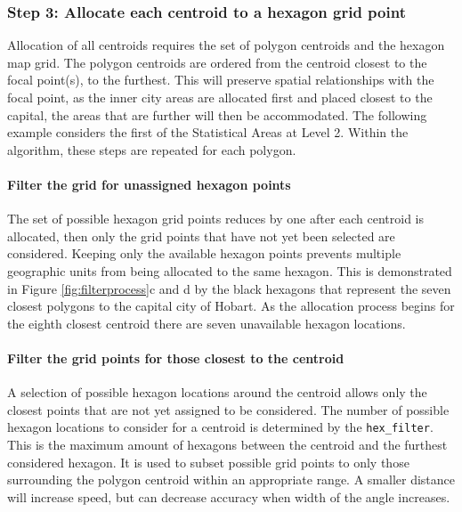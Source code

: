 \hypertarget{step-3-allocate-each-centroid-to-a-hexagon-grid-point}{%
\subsubsection{Step 3: Allocate each centroid to a hexagon grid
point}\label{step-3-allocate-each-centroid-to-a-hexagon-grid-point}}

Allocation of all centroids requires the set of polygon centroids and
the hexagon map grid. The polygon centroids are ordered from the
centroid closest to the focal point(s), to the furthest. This will
preserve spatial relationships with the focal point, as the inner city
areas are allocated first and placed closest to the capital, the areas
that are further will then be accommodated. The following example
considers the first of the Statistical Areas at Level 2. Within the
algorithm, these steps are repeated for each polygon.

\hypertarget{filter-the-grid-for-unassigned-hexagon-points}{%
\paragraph{Filter the grid for unassigned hexagon
points}\label{filter-the-grid-for-unassigned-hexagon-points}}

The set of possible hexagon grid points reduces by one after each
centroid is allocated, then only the grid points that have not yet been
selected are considered. Keeping only the available hexagon points
prevents multiple geographic units from being allocated to the same
hexagon. This is demonstrated in Figure \ref{fig:filterprocess}c and d
by the black hexagons that represent the seven closest polygons to the
capital city of Hobart. As the allocation process begins for the eighth
closest centroid there are seven unavailable hexagon locations.

\hypertarget{filter-the-grid-points-for-those-closest-to-the-centroid}{%
\paragraph{Filter the grid points for those closest to the
centroid}\label{filter-the-grid-points-for-those-closest-to-the-centroid}}

A selection of possible hexagon locations around the centroid allows
only the closest points that are not yet assigned to be considered. The
number of possible hexagon locations to consider for a centroid is
determined by the \texttt{hex\_filter}. This is the maximum amount of
hexagons between the centroid and the furthest considered hexagon. It is
used to subset possible grid points to only those surrounding the
polygon centroid within an appropriate range. A smaller distance will
increase speed, but can decrease accuracy when width of the angle
increases.

